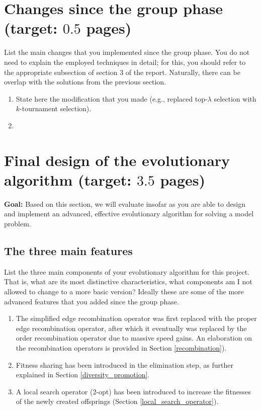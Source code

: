 \documentclass[a4paper,10pt]{article}
\newcommand{\ReplaceMe}[1]{{\color{blue}#1}}
\newcommand{\RemoveMe}[1]{{\color{purple}#1}}
\begin{document}
\section{Changes since the group phase (target: $0.5$ pages)} 

\ReplaceMe{List the main changes that you implemented since the group phase. You do not need to explain the employed techniques in detail; for this, you should refer to the appropriate subsection of section 3 of the report. Naturally, there can be overlap with the solutions from the previous section.}

\begin{enumerate}
 \item \ReplaceMe{State here the modification that you made (e.g., replaced top-$\lambda$ selection with $k$-tournament selection).}
 \item 
\end{enumerate}

\section{Final design of the evolutionary algorithm (target: $3.5$ pages)} 

\RemoveMe{\textbf{Goal:} Based on this section, we will evaluate insofar as you are able to design and implement an advanced, effective evolutionary algorithm for solving a model problem.}


\subsection{The three main features}
\ReplaceMe{List the three main components of your evolutionary algorithm for this project. That is, what are its most distinctive characteristics, what components am I not allowed to change to a more basic version? Ideally these are some of the more advanced features that you added since the group phase.}

\begin{enumerate}
 \item The simplified edge recombination operator was first replaced with the proper edge recombination operator, after which it eventually was replaced by the order recombination operator due to massive speed gains. An elaboration on the recombination operators is provided in Section \ref{recombination}). 
 \item Fitness sharing has been introduced in the elimination step, as further explained in Section \ref{diversity_promotion}.
 \item A local search operator (2-opt) has been introduced to increase the fitnesses of the newly created offsprings (Section \ref{local_search_operator}).
\end{enumerate}
\end{document}
